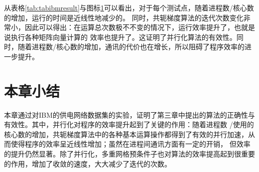 从表格\ref{tab:tabibmresult}与图标\ref{}可以看出，对于每个测试点，随着进程数/核心数的增加，运行的时间是近线性地减少的。
同时，共轭梯度算法的迭代次数变化非常小，因此可以得出：在运算总次数极不不变的情况下，运行效率提升了，也就是说执行各种矩阵向量计算的
效率也提升了。这证明了并行化算法的有效性。同时，随着进程数/核心数的增加，通讯的代价也在增长，所以阻碍了程序效率的进一步提升。

\section{本章小结}

本章通过对IBM的供电网络数据集的实验，证明了第三章中提出的算法的正确性与有效性。其中，并行化对程序的效率提升起到了关键的作用：随着进程数
/使用的核心数的增加，共轭梯度算法中的各种基本运算操作都得到了有效的并行加速，从而使得程序的效率呈近线性增加；虽然在进程间通讯方面有一定的开销，
但效率的提升仍然显著。除了并行化，多重网格预条件子也对算法的效率提高起到很重要的作用，增加了收敛的速度，大大减少了迭代的次数。
